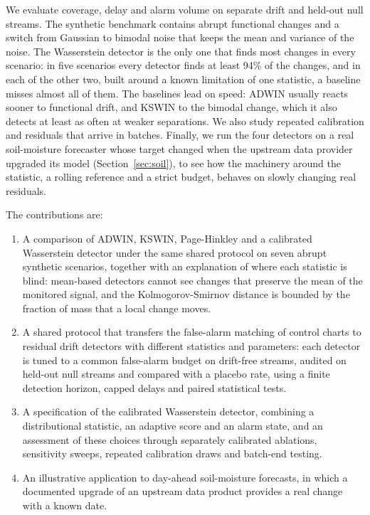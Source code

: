 \documentclass[preprint,12pt]{elsarticle}
\begin{document}
We evaluate coverage, delay and alarm volume on separate drift and held-out null streams. The synthetic benchmark contains abrupt functional changes and a switch from Gaussian to bimodal noise that keeps the mean and variance of the noise. The Wasserstein detector is the only one that finds most changes in every scenario: in five scenarios every detector finds at least 94\% of the changes, and in each of the other two, built around a known limitation of one statistic, a baseline misses almost all of them. The baselines lead on speed: ADWIN usually reacts sooner to functional drift, and KSWIN to the bimodal change, which it also detects at least as often at weaker separations. We also study repeated calibration and residuals that arrive in batches. Finally, we run the four detectors on a real soil-moisture forecaster whose target changed when the upstream data provider upgraded its model (Section~\ref{sec:soil}), to see how the machinery around the statistic, a rolling reference and a strict budget, behaves on slowly changing real residuals.

The contributions are:
\begin{enumerate}
\item A comparison of ADWIN, KSWIN, Page-Hinkley and a calibrated Wasserstein detector under the same shared protocol on seven abrupt synthetic scenarios, together with an explanation of where each statistic is blind: mean-based detectors cannot see changes that preserve the mean of the monitored signal, and the Kolmogorov-Smirnov distance is bounded by the fraction of mass that a local change moves.
\item A shared protocol that transfers the false-alarm matching of control charts to residual drift detectors with different statistics and parameters: each detector is tuned to a common false-alarm budget on drift-free streams, audited on held-out null streams and compared with a placebo rate, using a finite detection horizon, capped delays and paired statistical tests.
\item A specification of the calibrated Wasserstein detector, combining a distributional statistic, an adaptive score and an alarm state, and an assessment of these choices through separately calibrated ablations, sensitivity sweeps, repeated calibration draws and batch-end testing.
\item An illustrative application to day-ahead soil-moisture forecasts, in which a documented upgrade of an upstream data product provides a real change with a known date.
\end{enumerate}
\end{document}

